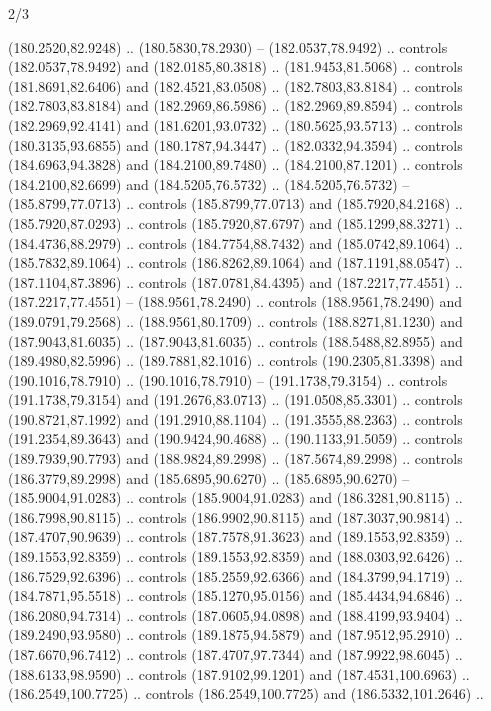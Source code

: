 \begin{flagdescription}{2/3}
\begin{scope}[xshift=0.5\flaglength,yshift=0.5\flagwidth,scale=\flagwidth/180]
\begin{scope}[y=0.8pt, x=0.8pt, yscale=-1,shift={(-168.75,-108.75)}]
  (180.2520,82.9248) .. (180.5830,78.2930) -- (182.0537,78.9492) .. controls
  (182.0537,78.9492) and (182.0185,80.3818) .. (181.9453,81.5068) .. controls
  (181.8691,82.6406) and (182.4521,83.0508) .. (182.7803,83.8184) .. controls
  (182.7803,83.8184) and (182.2969,86.5986) .. (182.2969,89.8594) .. controls
  (182.2969,92.4141) and (181.6201,93.0732) .. (180.5625,93.5713) .. controls
  (180.3135,93.6855) and (180.1787,94.3447) .. (182.0332,94.3594) .. controls
  (184.6963,94.3828) and (184.2100,89.7480) .. (184.2100,87.1201) .. controls
  (184.2100,82.6699) and (184.5205,76.5732) .. (184.5205,76.5732) --
  (185.8799,77.0713) .. controls (185.8799,77.0713) and (185.7920,84.2168) ..
  (185.7920,87.0293) .. controls (185.7920,87.6797) and (185.1299,88.3271) ..
  (184.4736,88.2979) .. controls (184.7754,88.7432) and (185.0742,89.1064) ..
  (185.7832,89.1064) .. controls (186.8262,89.1064) and (187.1191,88.0547) ..
  (187.1104,87.3896) .. controls (187.0781,84.4395) and (187.2217,77.4551) ..
  (187.2217,77.4551) -- (188.9561,78.2490) .. controls (188.9561,78.2490) and
  (189.0791,79.2568) .. (188.9561,80.1709) .. controls (188.8271,81.1230) and
  (187.9043,81.6035) .. (187.9043,81.6035) .. controls (188.5488,82.8955) and
  (189.4980,82.5996) .. (189.7881,82.1016) .. controls (190.2305,81.3398) and
  (190.1016,78.7910) .. (190.1016,78.7910) -- (191.1738,79.3154) .. controls
  (191.1738,79.3154) and (191.2676,83.0713) .. (191.0508,85.3301) .. controls
  (190.8721,87.1992) and (191.2910,88.1104) .. (191.3555,88.2363) .. controls
  (191.2354,89.3643) and (190.9424,90.4688) .. (190.1133,91.5059) .. controls
  (189.7939,90.7793) and (188.9824,89.2998) .. (187.5674,89.2998) .. controls
  (186.3779,89.2998) and (185.6895,90.6270) .. (185.6895,90.6270) --
  (185.9004,91.0283) .. controls (185.9004,91.0283) and (186.3281,90.8115) ..
  (186.7998,90.8115) .. controls (186.9902,90.8115) and (187.3037,90.9814) ..
  (187.4707,90.9639) .. controls (187.7578,91.3623) and (189.1553,92.8359) ..
  (189.1553,92.8359) .. controls (189.1553,92.8359) and (188.0303,92.6426) ..
  (186.7529,92.6396) .. controls (185.2559,92.6366) and (184.3799,94.1719) ..
  (184.7871,95.5518) .. controls (185.1270,95.0156) and (185.4434,94.6846) ..
  (186.2080,94.7314) .. controls (187.0605,94.0898) and (188.4199,93.9404) ..
  (189.2490,93.9580) .. controls (189.1875,94.5879) and (187.9512,95.2910) ..
  (187.6670,96.7412) .. controls (187.4707,97.7344) and (187.9922,98.6045) ..
  (188.6133,98.9590) .. controls (187.9102,99.1201) and (187.4531,100.6963) ..
  (186.2549,100.7725) .. controls (186.2549,100.7725) and (186.5332,101.2646) ..

\end{scope}
\end{scope}
\end{flagdescription}
